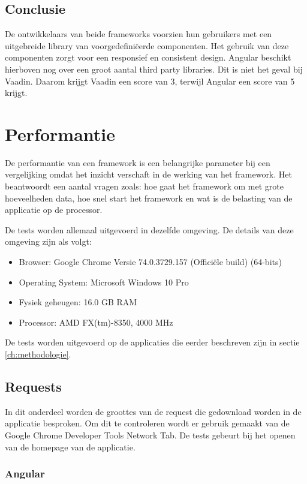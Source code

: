 \subsection{Conclusie}
De ontwikkelaars van beide frameworks voorzien hun gebruikers met een uitgebreide library van voorgedefiniëerde componenten. Het gebruik van deze componenten zorgt voor een responsief en consistent design. Angular beschikt hierboven nog over een groot aantal third party libraries. Dit is niet het geval bij Vaadin.
Daarom krijgt Vaadin een score van 3, terwijl Angular een score van 5 krijgt.

\section{Performantie}
De performantie van een framework is een belangrijke parameter bij een vergelijking omdat het inzicht verschaft in de werking van het framework. Het beantwoordt een aantal vragen zoals: hoe gaat het framework om met grote hoeveelheden data, hoe snel start het framework en wat is de belasting van de applicatie op de processor.

De tests worden allemaal uitgevoerd in dezelfde omgeving. De details van deze omgeving zijn als volgt:

\begin{itemize}
	
	\item Browser: Google Chrome Versie 74.0.3729.157 (Officiële build) (64-bits)
	\item Operating System: Microsoft Windows 10 Pro
	\item Fysiek geheugen: 16.0 GB RAM
	\item Processor: AMD FX(tm)-8350, 4000 MHz
\end{itemize}

De tests worden uitgevoerd op de applicaties die eerder beschreven zijn in sectie \ref{ch:methodologie}.

\subsection{Requests}
In dit onderdeel worden de groottes van de request die gedownload worden in de applicatie besproken. Om dit te controleren wordt er gebruik gemaakt van de Google Chrome Developer Tools Network Tab. De tests gebeurt bij het openen van de homepage van de applicatie.
\subsubsection{Angular}

